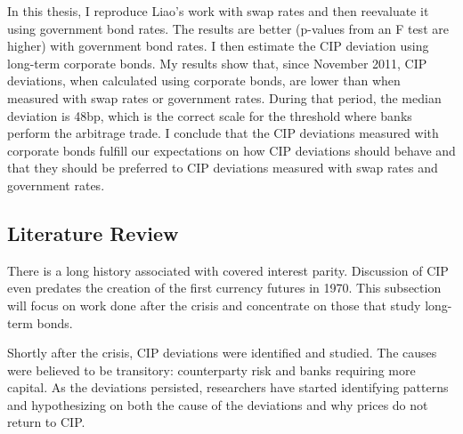 In this thesis, I reproduce Liao's work with swap rates and then reevaluate it using government bond rates.  The results are better (p-values from an F test are higher) with government bond rates.  I then estimate the CIP deviation using long-term corporate bonds.  My results show that, since November 2011, CIP deviations, when calculated using corporate bonds, are lower than when measured with swap rates or government rates.  During that period, the median deviation is 48bp, which is the correct scale for the threshold where banks perform the arbitrage trade.  I conclude that the CIP deviations measured with corporate bonds fulfill our expectations on how CIP deviations should behave and that they should be preferred to CIP deviations measured with swap rates and government rates.






\subsection{Literature Review}


There is a long history associated with covered interest parity.  Discussion of CIP even predates the creation of the first currency futures in 1970.\cite{Kolb2010}  This subsection will focus on work done after the crisis and concentrate on those that study long-term bonds.  


Shortly after the crisis, CIP deviations were identified and studied.  The causes were believed to be transitory: counterparty risk and banks requiring more capital.\cite{Coffey2009}  As the deviations persisted, researchers have started identifying patterns and hypothesizing on both the cause of the deviations and why prices do not return to CIP. 

